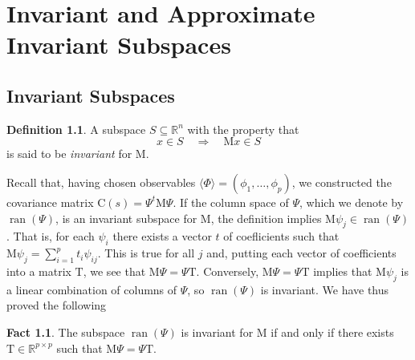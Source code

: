 \documentclass[12pt,letterpaper]{report}
\theoremstyle{plain}
\theoremstyle{definition}
\newtheorem{definition}[theorem]{Definition}
\newtheorem*{fact}{Fact}
\theoremstyle{remark}
\numberwithin{theorem}{chapter}
\numberwithin{claim}{chapter}
\numberwithin{equation}{chapter}
\numberwithin{conjecture}{chapter}
\newcommand\R{\ensuremath{\mathbb{R}}}
\newcommand\C{\ensuremath{\mathrm{C}}}
\newcommand\M{\ensuremath{\mathrm{M}}}
\newcommand\T{\ensuremath{\mathrm{T}}}
\newcommand\ran{\ensuremath{\operatorname{ran}}}
\newcommand\<{\ensuremath{\langle}}
\renewcommand\>{\ensuremath{\rangle}}
\begin{document}
\chapter{Invariant and Approximate Invariant Subspaces}
\label{cha:invar-appr-invar}
\section{Invariant Subspaces}

\begin{definition}
A subspace $S \subseteq \R^n$ with the property that
\[
x \in S \quad \Longrightarrow \quad \M x \in S
\]
is said to be \emph{invariant} for $\M$.
\end{definition}

Recall that, having chosen observables $\<\Phi\> = (\phi_1, \dots, \phi_p)$, we
constructed the covariance matrix 
$\C(s) = \Psi^t \M \Psi$. 
If the column space of $\Psi$, which we denote by $\ran(\Psi)$, is an invariant
subspace for $\M$, the definition implies $\M\psi_j \in \ran(\Psi)$.
That is, for each $\psi_i$ there exists a vector
$t$ of coeﬂicients such that $\M \psi_j = \sum_{i=1}^p t_i \psi_{ij}$. 
This is true for all $j$ and, putting each vector of
coefficients into a matrix $\T$, we see that 
$\M \Psi = \Psi \T$. Conversely, $\M\Psi = \Psi \T$ implies that $\M\psi_j$ is a
linear combination of columns of $\Psi$, so $\ran(\Psi)$ is invariant. We have
thus proved the following 
\begin{fact}
\label{fact:3.1.1}
The subspace $\ran(\Psi)$ is invariant for $\M$ if and only if there exists 
$\T \in \R^{p\times p}$ such that $\M\Psi = \Psi \T$.
\end{fact}
\end{document}
